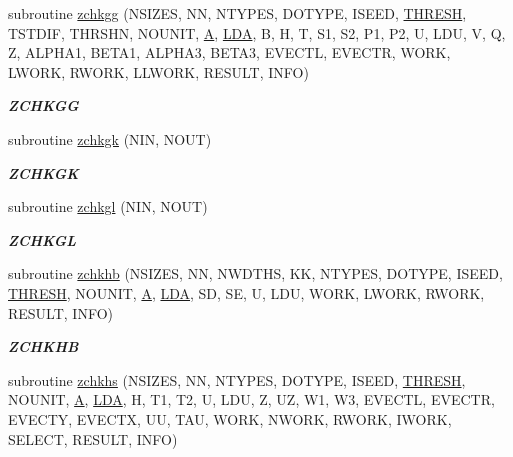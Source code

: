 \begin{DoxyCompactItemize}
subroutine \hyperlink{group__complex16__eig_ga0b24cd17637a0c7c2689c338e3beb720}{zchkgg} (N\+S\+I\+Z\+E\+S, N\+N, N\+T\+Y\+P\+E\+S, D\+O\+T\+Y\+P\+E, I\+S\+E\+E\+D, \hyperlink{zlaqgs_8c_a0656018abfc9fa2821827415f5d5ea57}{T\+H\+R\+E\+S\+H}, T\+S\+T\+D\+I\+F, T\+H\+R\+S\+H\+N, N\+O\+U\+N\+I\+T, \hyperlink{classA}{A}, \hyperlink{example__user_8c_ae946da542ce0db94dced19b2ecefd1aa}{L\+D\+A}, B, H, T, S1, S2, P1, P2, U, L\+D\+U, V, Q, Z, A\+L\+P\+H\+A1, B\+E\+T\+A1, A\+L\+P\+H\+A3, B\+E\+T\+A3, E\+V\+E\+C\+T\+L, E\+V\+E\+C\+T\+R, W\+O\+R\+K, L\+W\+O\+R\+K, R\+W\+O\+R\+K, L\+L\+W\+O\+R\+K, R\+E\+S\+U\+L\+T, I\+N\+F\+O)
\begin{DoxyCompactList}\small\item\em {\bfseries Z\+C\+H\+K\+G\+G} \end{DoxyCompactList}\item 
subroutine \hyperlink{group__complex16__eig_ga0aa6f942e1e31569fa01d6b77572c3f6}{zchkgk} (N\+I\+N, N\+O\+U\+T)
\begin{DoxyCompactList}\small\item\em {\bfseries Z\+C\+H\+K\+G\+K} \end{DoxyCompactList}\item 
subroutine \hyperlink{group__complex16__eig_ga2452dadb41e2405e8c575902c4b7a2a2}{zchkgl} (N\+I\+N, N\+O\+U\+T)
\begin{DoxyCompactList}\small\item\em {\bfseries Z\+C\+H\+K\+G\+L} \end{DoxyCompactList}\item 
subroutine \hyperlink{group__complex16__eig_gac3ea5af78cd94f1a41d4a27e56481087}{zchkhb} (N\+S\+I\+Z\+E\+S, N\+N, N\+W\+D\+T\+H\+S, K\+K, N\+T\+Y\+P\+E\+S, D\+O\+T\+Y\+P\+E, I\+S\+E\+E\+D, \hyperlink{zlaqgs_8c_a0656018abfc9fa2821827415f5d5ea57}{T\+H\+R\+E\+S\+H}, N\+O\+U\+N\+I\+T, \hyperlink{classA}{A}, \hyperlink{example__user_8c_ae946da542ce0db94dced19b2ecefd1aa}{L\+D\+A}, S\+D, S\+E, U, L\+D\+U, W\+O\+R\+K, L\+W\+O\+R\+K, R\+W\+O\+R\+K, R\+E\+S\+U\+L\+T, I\+N\+F\+O)
\begin{DoxyCompactList}\small\item\em {\bfseries Z\+C\+H\+K\+H\+B} \end{DoxyCompactList}\item 
subroutine \hyperlink{group__complex16__eig_ga427e9c206762384bc4e7b5bc787e6073}{zchkhs} (N\+S\+I\+Z\+E\+S, N\+N, N\+T\+Y\+P\+E\+S, D\+O\+T\+Y\+P\+E, I\+S\+E\+E\+D, \hyperlink{zlaqgs_8c_a0656018abfc9fa2821827415f5d5ea57}{T\+H\+R\+E\+S\+H}, N\+O\+U\+N\+I\+T, \hyperlink{classA}{A}, \hyperlink{example__user_8c_ae946da542ce0db94dced19b2ecefd1aa}{L\+D\+A}, H, T1, T2, U, L\+D\+U, Z, U\+Z, W1, W3, E\+V\+E\+C\+T\+L, E\+V\+E\+C\+T\+R, E\+V\+E\+C\+T\+Y, E\+V\+E\+C\+T\+X, U\+U, T\+A\+U, W\+O\+R\+K, N\+W\+O\+R\+K, R\+W\+O\+R\+K, I\+W\+O\+R\+K, S\+E\+L\+E\+C\+T, R\+E\+S\+U\+L\+T, I\+N\+F\+O)

\end{DoxyCompactItemize}
